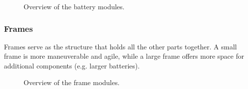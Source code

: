 \documentclass[sigconf,review]{acmart}
\begin{document}
\begin{figure}[htbp]
    \hfill
    \hfill
    \caption{Overview of the battery modules.}
    \label{fig:batteries}
\end{figure}

\subsubsection{Frames}
\label{sec:frames}

Frames serve as the structure that holds all the other parts together. 
A small frame is more maneuverable and agile, while a large frame offers more space for additional components (e.g. larger batteries).

\begin{figure}[htbp]
    \hfill

    \caption{Overview of the frame modules.}
    \label{fig:frames}
\end{figure}
\end{document}
